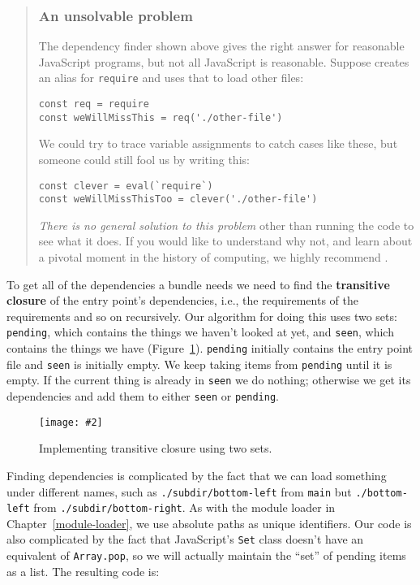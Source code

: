 \documentclass[krantzl]{krantz}
\newcommand{\figpdf}[4]{\begin{figure}%
\centering%
\texttt{[image: \#2]}%
\caption{#3}%
\label{#1}%
\end{figure}}
\newcommand{\chapref}[1]{Chapter~\ref{#1}}
\newcommand{\figref}[1]{Figure~\ref{#1}}
\newcommand{\glossref}[1]{\textbf{#1}}
\newenvironment{callout}{\savenotes\begin{tBox}\begin{quotation}\toggletrue{inbox}\renewcommand{\thempfootnote}{\arabic{footnote}}}{\end{quotation}\vspace{\baselineskip}\end{tBox}\togglefalse{inbox}\spewnotes}
\begin{document}
\begin{callout}


\subsubsection*{An unsolvable problem}


The dependency finder shown above gives the right answer for reasonable JavaScript programs,
but not all JavaScript is reasonable.
Suppose creates an alias for \texttt{require} and uses that to load other files:

\begin{lstlisting}[frame=tblr]
const req = require
const weWillMissThis = req('./other-file')
\end{lstlisting}


We could try to trace variable assignments to catch cases like these,
but someone could still fool us by writing this:

\begin{lstlisting}[frame=tblr]
const clever = eval(`require`)
const weWillMissThisToo = clever('./other-file')
\end{lstlisting}


\emph{There is no general solution to this problem}
other than running the code to see what it does.
If you would like to understand why not,
and learn about a pivotal moment in the history of computing,
we highly recommend \cite{Petzold2008}.

\end{callout}


To get all of the dependencies a bundle needs
we need to find the \glossref{transitive closure} of the entry point’s dependencies,
i.e.,
the requirements of the requirements and so on recursively.
Our algorithm for doing this uses two sets:
\texttt{pending},
which contains the things we haven’t looked at yet,
and \texttt{seen},
which contains the things we have
(\figref{module-bundler-transitive-closure}).
\texttt{pending} initially contains the entry point file and \texttt{seen} is initially empty.
We keep taking items from \texttt{pending} until it is empty.
If the current thing is already in \texttt{seen} we do nothing;
otherwise we get its dependencies and add them to either \texttt{seen} or \texttt{pending}.

\figpdf{module-bundler-transitive-closure}{./module-bundler/transitive-closure.pdf}{Implementing transitive closure using two sets.}{0.6}


Finding dependencies is complicated by the fact that we can load something under different names,
such as \texttt{./subdir/bottom-left} from \texttt{main} but \texttt{./bottom-left} from \texttt{./subdir/bottom-right}.
As with the module loader in \chapref{module-loader},
we use absolute paths as unique identifiers.
Our code is also complicated by the fact that JavaScript’s \texttt{Set} class doesn’t have an equivalent of \texttt{Array.pop},
so we will actually maintain the “set” of pending items as a list.
The resulting code is:
\end{document}
